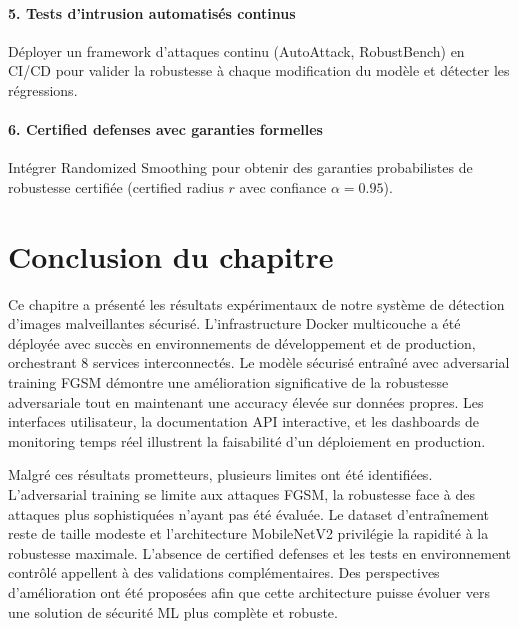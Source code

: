 \paragraph{5. Tests d'intrusion automatisés continus}

Déployer un framework d'attaques continu (AutoAttack, RobustBench) en CI/CD pour valider la robustesse à chaque modification du modèle et détecter les régressions.

\paragraph{6. Certified defenses avec garanties formelles}

Intégrer Randomized Smoothing pour obtenir des garanties probabilistes de robustesse certifiée (certified radius $r$ avec confiance $\alpha = 0.95$).


\section{Conclusion du chapitre}

Ce chapitre a présenté les résultats expérimentaux de notre système de détection d'images malveillantes sécurisé. L'infrastructure Docker multicouche a été déployée avec succès en environnements de développement et de production, orchestrant 8 services interconnectés. Le modèle sécurisé entraîné avec adversarial training FGSM démontre une amélioration significative de la robustesse adversariale tout en maintenant une accuracy élevée sur données propres. Les interfaces utilisateur, la documentation API interactive, et les dashboards de monitoring temps réel illustrent la faisabilité d'un déploiement en production. 

Malgré ces résultats prometteurs, plusieurs limites ont été identifiées. L'adversarial training se limite aux attaques FGSM, la robustesse face à des attaques plus sophistiquées n'ayant pas été évaluée. Le dataset d'entraînement reste de taille modeste et l'architecture MobileNetV2 privilégie la rapidité à la robustesse maximale. L'absence de certified defenses et les tests en environnement contrôlé appellent à des validations complémentaires. Des perspectives d'amélioration ont été proposées afin que cette architecture puisse évoluer vers une solution de sécurité ML plus complète et robuste.
